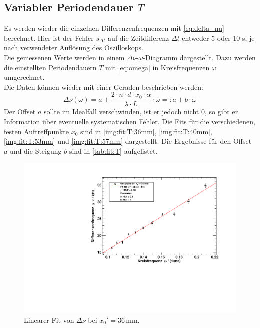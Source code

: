 \subsection{Variabler Periodendauer \texorpdfstring{$T$}{T}}
Es werden wieder die einzelnen Differenzenfrequenzen mit \autoref{eq:delta_nu} berechnet. Hier ist der Fehler $s_{\Delta t}$ 
auf die Zeitdifferenz $\Delta t$ entweder 5 oder 10 \textmu s, je nach verwendeter Auflösung des Oszilloskops. \\
Die gemessenen Werte werden in einem $\Delta \nu$-$\omega$-Diagramm dargestellt. 
Dazu werden die einstellten Periodendauern $T$ mit \autoref{eq:omega} in Kreisfrequenzen $\omega$ umgerechnet. \\
Die Daten können wieder mit einer Geraden beschrieben werden:
\begin{equation}
  \label{eq:nu_omega}
  \Delta \nu (\omega) = a + \frac{2 \cdot n \cdot d \cdot x_0 \cdot \alpha}{\lambda \cdot L} \cdot \omega  =: a + b \cdot \omega
\end{equation}
Der Offset $a$ sollte im Idealfall verschwinden, ist er jedoch nicht 0, so gibt er Information über eventuelle systematischen Fehler.
Die Fits für die verschiedenen, festen Auftreffpunkte $x_0$ sind in \autoref{img:fit:T:36mm}, \autoref{img:fit:T:40mm}, \autoref{img:fit:T:53mm} 
und \autoref{img:fit:T:57mm} dargestellt. Die Ergebnisse für den Offset $a$ und die Steigung $b$ sind in \autoref{tab:fit:T} aufgelistet.

\begin{figure}[H]
\begin{center}
  \includegraphics[width=\textwidth]{../img/fit_x0_36mm.pdf}
  \caption{Linearer Fit von $\Delta \nu$ bei $x_0' = 36$\,mm.}
  \label{img:fit:T:36mm}
\end{center}
\end{figure}

